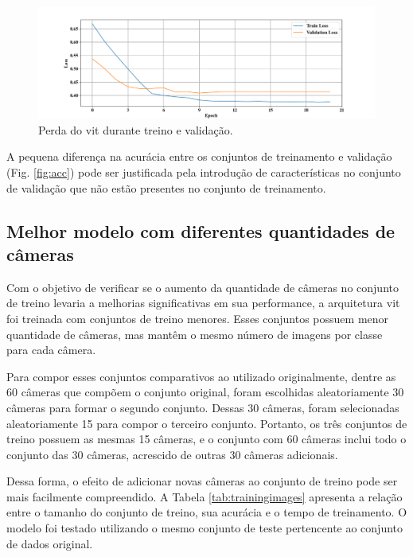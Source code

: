 \begin{figure}[tb]
\centerline{\includegraphics[width=1\linewidth]{images/resultados/sgd_loss.png}}
\caption{Perda do \acrshort{vit} durante treino e validação.}
\label{fig:loss}
\end{figure}

A pequena diferença na acurácia entre os conjuntos de treinamento e validação (Fig. \ref{fig:acc}) pode ser justificada pela introdução de características no conjunto de validação que não estão presentes no conjunto de treinamento.

\subsection{Melhor modelo com diferentes quantidades de câmeras}\label{sec:cameraquantity}

Com o objetivo de verificar se o aumento da quantidade de câmeras no conjunto de treino levaria a melhorias significativas em sua performance, a arquitetura \acrshort{vit} foi treinada com conjuntos de treino menores.
Esses conjuntos possuem menor quantidade de câmeras, mas mantêm o mesmo número de imagens por classe para cada câmera.

Para compor esses conjuntos comparativos ao utilizado originalmente, dentre as 60 câmeras que compõem o conjunto original, foram escolhidas aleatoriamente 30 câmeras para formar o segundo conjunto.
Dessas 30 câmeras, foram selecionadas aleatoriamente 15 para compor o terceiro conjunto.
Portanto, os três conjuntos de treino possuem as mesmas 15 câmeras, e o conjunto com 60 câmeras inclui todo o conjunto das 30 câmeras, acrescido de outras 30 câmeras adicionais.

Dessa forma, o efeito de adicionar novas câmeras ao conjunto de treino pode ser mais facilmente compreendido.
A Tabela \ref{tab:trainingimages} apresenta a relação entre o tamanho do conjunto de treino, sua acurácia e o tempo de treinamento.
O modelo foi testado utilizando o mesmo conjunto de teste pertencente ao conjunto de dados original.

